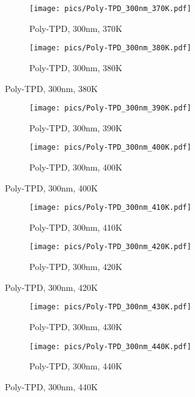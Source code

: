 \begin{figure}[!htb]
\centering
\begin{subfigure}[t]{.5\textwidth}
  \centering
  \texttt{[image: pics/Poly-TPD\_300nm\_370K.pdf]}
  \caption{Poly-TPD, 300nm, 370K}
  \label{fig:sub73}
\end{subfigure}%
\begin{subfigure}[t]{.5\textwidth}
  \centering
  \texttt{[image: pics/Poly-TPD\_300nm\_380K.pdf]}
  \caption{Poly-TPD, 300nm, 380K}
  \label{fig:sub74}
\end{subfigure}%
\end{figure}

\begin{figure}[!htb]
\centering
\begin{subfigure}[t]{.5\textwidth}
  \centering
  \texttt{[image: pics/Poly-TPD\_300nm\_390K.pdf]}
  \caption{Poly-TPD, 300nm, 390K}
  \label{fig:sub75}
\end{subfigure}%
\begin{subfigure}[t]{.5\textwidth}
  \centering
  \texttt{[image: pics/Poly-TPD\_300nm\_400K.pdf]}
  \caption{Poly-TPD, 300nm, 400K}
  \label{fig:sub76}
\end{subfigure}%
\end{figure}

\begin{figure}[!htb]
\centering
\begin{subfigure}[t]{.5\textwidth}
  \centering
  \texttt{[image: pics/Poly-TPD\_300nm\_410K.pdf]}
  \caption{Poly-TPD, 300nm, 410K}
  \label{fig:sub77}
\end{subfigure}%
\begin{subfigure}[t]{.5\textwidth}
  \centering
  \texttt{[image: pics/Poly-TPD\_300nm\_420K.pdf]}
  \caption{Poly-TPD, 300nm, 420K}
  \label{fig:sub78}
\end{subfigure}%
\end{figure}

\begin{figure}[!htb]
\centering
\begin{subfigure}[t]{.5\textwidth}
  \centering
  \texttt{[image: pics/Poly-TPD\_300nm\_430K.pdf]}
  \caption{Poly-TPD, 300nm, 430K}
  \label{fig:sub79}
\end{subfigure}%
\begin{subfigure}[t]{.5\textwidth}
  \centering
  \texttt{[image: pics/Poly-TPD\_300nm\_440K.pdf]}
  \caption{Poly-TPD, 300nm, 440K}
  \label{fig:sub80}
\end{subfigure}%
\end{figure}

